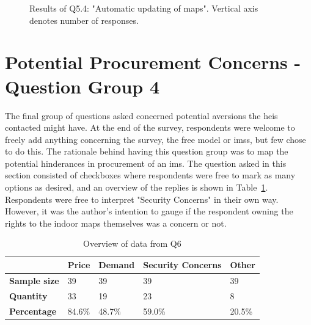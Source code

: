 \begin{figure}[H]
    \centering
    \caption{Results of Q5.4: "Automatic updating of maps". Vertical axis denotes number of responses.}
    \label{fig:q54}
\end{figure}

\newpage

\section{Potential Procurement Concerns - Question Group 4}
The final group of questions asked concerned potential aversions the \glspl{hei} contacted might have. At the end of the survey, respondents were welcome to freely add anything concerning the survey, the free model or \glspl{ims}, but few chose to do this. The rationale behind having this question group was to map the potential hinderances in procurement of an \gls{ims}. The question asked in this section consisted of checkboxes where respondents were free to mark as many options as desired, and an overview of the replies is shown in Table~\ref{q6}. Respondents were free to interpret "Security Concerns" in their own way. However, it was the author's intention to gauge if the respondent owning the rights to the indoor maps themselves was a concern or not.


\begin{table}[H]
\centering
\caption{Overview of data from Q6}
\label{q6}
\begin{tabular}{l|l|l|l|l|}
\cline{2-5}
                                           & \textbf{Price} & \textbf{Demand} & \textbf{Security Concerns} & \textbf{Other} \\ \hline
\multicolumn{1}{|l|}{\textbf{Sample size}} & 39             & 39              & 39                         & 39             \\ \hline
\multicolumn{1}{|l|}{\textbf{Quantity}}    & 33             & 19              & 23                         & 8              \\ \hline
\multicolumn{1}{|l|}{\textbf{Percentage}}  & 84.6\%         & 48.7\%          & 59.0\%                     & 20.5\%         \\ \hline
\end{tabular}
\end{table}

